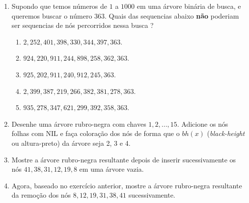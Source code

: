 \begin{enumerate}
\item  Supondo que temos números de $1$ a $1000$ em uma árvore binária de busca,
e queremos buscar o número $363$. Quais das sequencias abaixo {\bf não} 
poderiam ser sequencias de nós percorridos nessa busca ?
	\begin{enumerate}
	\item $2,252,401,398,330,344,397,363$.
	\item $924, 220, 911, 244, 898, 258, 362, 363$.
	\item $925, 202, 911, 240, 912, 245, 363$.
	\item $2,399,387,219,266,382,381,278,363$.
	\item $935, 278, 347, 621, 299, 392, 358, 363$.
	\end{enumerate}

\item Desenhe uma árvore rubro-negra com chaves ${1, 2, ..., 15}$.
Adicione os nós folhas com \textsc{NIL} e faça coloração dos nós de forma
que o $bh(x)$ (\emph{black-height} ou altura-preto) da árvore seja 2, 3 e 4.

\item Mostre a árvore rubro-negra resultante depois de inserir sucessivamente
os nós ${41, 38, 31, 12, 19, 8}$ em uma árvore vazia.

\item Agora, baseado no exercício anterior,  mostre a árvore rubro-negra
resultante da remoção dos nós ${8, 12, 19, 31, 38, 41}$ sucessivamente.

\end{enumerate}
